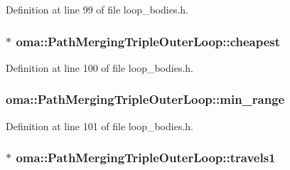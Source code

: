 Definition at line 99 of file loop\-\_\-bodies.\-h.

\hypertarget{classoma_1_1_path_merging_triple_outer_loop_a963284c20dbc179aac8be227de3b736b}{
\subsubsection[{cheapest}]{$\ast$ oma\-::\-Path\-Merging\-Triple\-Outer\-Loop\-::cheapest\hspace{0.3cm}{\ttfamily [protected]}}}\label{classoma_1_1_path_merging_triple_outer_loop_a963284c20dbc179aac8be227de3b736b}


Definition at line 100 of file loop\-\_\-bodies.\-h.

\hypertarget{classoma_1_1_path_merging_triple_outer_loop_aebc3758ded80d3a61500b8a80c963061}{
\subsubsection[{min\-\_\-range}]{ oma\-::\-Path\-Merging\-Triple\-Outer\-Loop\-::min\-\_\-range\hspace{0.3cm}{\ttfamily [protected]}}}\label{classoma_1_1_path_merging_triple_outer_loop_aebc3758ded80d3a61500b8a80c963061}


Definition at line 101 of file loop\-\_\-bodies.\-h.

\hypertarget{classoma_1_1_path_merging_triple_outer_loop_a0720980b36610f250de8344bd24e0df1}{
\subsubsection[{travels1}]{$\ast$ oma\-::\-Path\-Merging\-Triple\-Outer\-Loop\-::travels1\hspace{0.3cm}{\ttfamily [protected]}}}\label{classoma_1_1_path_merging_triple_outer_loop_a0720980b36610f250de8344bd24e0df1}


